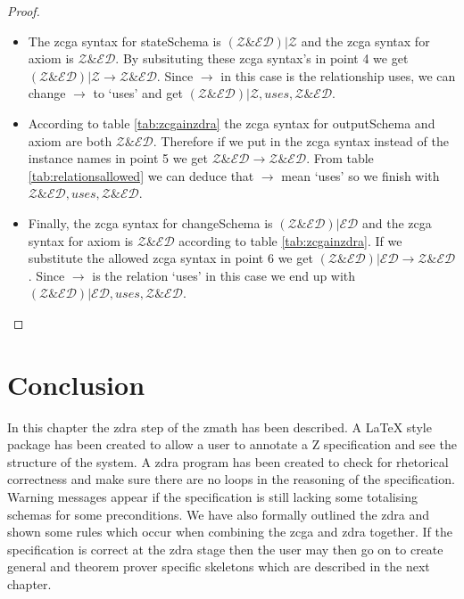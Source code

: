 \begin{proof}
\begin{itemize}
\item The \gls{zcga} syntax for stateSchema is $(\mathcal{Z} \& \mathcal{ED}) | \mathcal{Z}$ and the \gls{zcga} syntax for axiom is  $\mathcal{Z} \& \mathcal{ED}$. By subsituting these \gls{zcga} syntax's in point 4 we get $(\mathcal{Z} \& \mathcal{ED}) | \mathcal{Z} \longrightarrow \mathcal{Z} \& \mathcal{ED}$. Since $\longrightarrow$ in this case is the relationship uses, we can change $\longrightarrow$ to `uses' and get $(\mathcal{Z} \& \mathcal{ED}) | \mathcal{Z}, uses, \mathcal{Z} \& \mathcal{ED}$.

\item According to table \ref{tab:zcgainzdra} the \gls{zcga} syntax for outputSchema and axiom are both $\mathcal{Z} \& \mathcal{ED}$. Therefore if we put in the \gls{zcga} syntax instead of the instance names in point 5 we get $\mathcal{Z} \& \mathcal{ED} \longrightarrow \mathcal{Z} \& \mathcal{ED}$. From table \ref{tab:relationsallowed} we can deduce that $\longrightarrow$ mean `uses' so we finish with $\mathcal{Z} \& \mathcal{ED}, uses, \mathcal{Z} \& \mathcal{ED}$.

\item Finally, the \gls{zcga} syntax for changeSchema is $(\mathcal{Z} \& \mathcal{ED}) | \mathcal{ED}$ and the \gls{zcga} syntax for axiom is $\mathcal{Z} \& \mathcal{ED}$ according to table \ref{tab:zcgainzdra}. If we substitute the allowed \gls{zcga} syntax in point 6 we get $(\mathcal{Z} \& \mathcal{ED}) | \mathcal{ED} \longrightarrow \mathcal{Z} \& \mathcal{ED}$. Since $\longrightarrow$ is the relation `uses' in this case we end up with $(\mathcal{Z} \& \mathcal{ED}) | \mathcal{ED}, uses, \mathcal{Z} \& \mathcal{ED}$.
\end{itemize}
\end{proof}

\section{Conclusion}
In this chapter the \gls{zdra} step of the \gls{zmath} has been described. A \LaTeX{} style package has been created to allow a user to annotate a Z specification and see the structure of the system. A \gls{zdra} program has been created to check for rhetorical correctness and make sure there are no loops in the reasoning of the specification. Warning messages appear if the specification is still lacking some totalising schemas for some preconditions. We have also formally outlined the \gls{zdra} and shown some rules which occur when combining the \gls{zcga} and \gls{zdra} together. If the specification is correct at the \gls{zdra} stage then the user may then go on to create general and theorem prover specific skeletons which are described in the next chapter.